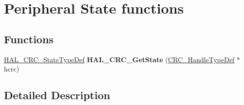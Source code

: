\hypertarget{group___c_r_c___exported___functions___group3}{}\section{Peripheral State functions}
\label{group___c_r_c___exported___functions___group3}
\subsection*{Functions}
\begin{DoxyCompactItemize}
\item 
\hyperlink{group___c_r_c___exported___types___group1_ga1021d6f27a072d45f6f3b233eefd8bbe}{H\+A\+L\+\_\+\+C\+R\+C\+\_\+\+State\+Type\+Def} {\bfseries H\+A\+L\+\_\+\+C\+R\+C\+\_\+\+Get\+State} (\hyperlink{struct_c_r_c___handle_type_def}{C\+R\+C\+\_\+\+Handle\+Type\+Def} $\ast$hcrc)\hypertarget{group___c_r_c___exported___functions___group3_ga4fb3d3460bd83853c28215bc5e14babe}{}\label{group___c_r_c___exported___functions___group3_ga4fb3d3460bd83853c28215bc5e14babe}

\end{DoxyCompactItemize}


\subsection{Detailed Description}
